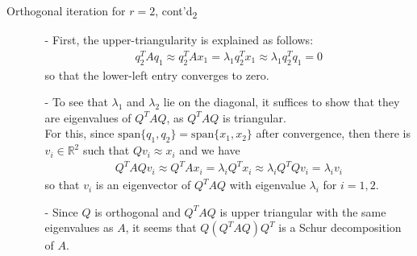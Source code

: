 \documentclass[t,usepdftitle=false]{beamer}
\begin{document}
\begin{frame}{Orthogonal iteration for $r=2$, cont'd\textsubscript{2}}
\begin{itemize}
\item[]
\begin{itemize}\normalsize
\item[-] First, the upper-triangularity is explained as follows:
\begin{align*}
q_2^TAq_1\approx q_2^TAx_1=\lambda_1q_2^Tx_1\approx\lambda_1q_2^Tq_1=0
\end{align*}
so that the lower-left entry converges to zero.\vspace{.1cm}\\
\item[-] To see that $\lambda_1$ and $\lambda_2$ lie on the diagonal, it suffices to show that they are eigenvalues of $Q^TAQ$, as $Q^TAQ$ is triangular.\vspace{.1cm}\\
For this, since $\mathrm{span}\{q_1,q_2\}=\mathrm{span}\{x_1,x_2\}$ after convergence, then there is $v_i\in\mathbb{R}^2$ such that $Qv_i\approx x_i$ and we have
\begin{align*}
Q^TAQv_i\approx Q^TAx_i=\lambda_iQ^Tx_i\approx \lambda_i Q^TQv_i=\lambda_iv_i
\end{align*}
so that $v_i$ is an eigenvector of $Q^TAQ$ with eigenvalue $\lambda_i$ for $i=1,2$.\vspace{.1cm}\\
\item[-] Since $Q$ is orthogonal and $Q^TAQ$ is upper triangular with the same eigenvalues as $A$, it seems that $Q(Q^TAQ)Q^T$ is a Schur decomposition of $A$.
\end{itemize}
\end{itemize}
\end{frame}
\end{document}
